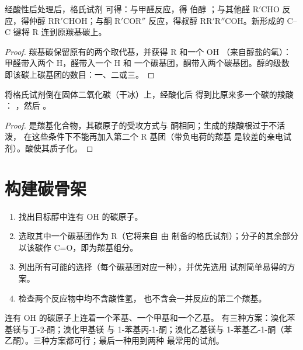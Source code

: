 \begin{proposition}[由羰基化合物制备醇]\label{prop:b1:organomagnesium:carbonyl-addition}
经酸性后处理后，格氏试剂  可得：与甲醛反应，得
伯醇 ；与其他醛 $\mathrm{R'CHO}$ 反应，得仲醇
$\mathrm{RR'CHOH}$；与酮 $\mathrm{R'COR''}$ 反应，得叔醇
$\mathrm{RR'R''COH}$。新形成的 C--C 键将 R 连到原羰基碳上。
\end{proposition}

\begin{proof}
羰基碳保留原有的两个取代基，并获得 R 和一个 OH
（来自醇盐的氧）：甲醛带入两个 H，醛带入一个 H 和
一个碳基团，酮带入两个碳基团。醇的级数
即该碳上碳基团的数目：一、二或三。
\end{proof}

\begin{proposition}[由二氧化碳制备羧酸]\label{prop:b1:organomagnesium:co2}
将格氏试剂倒在固体二氧化碳（干冰）上，经酸化后
得到比原来多一个碳的羧酸 ：
，然后 。
\end{proposition}

\begin{proof}
 是羰基化合物，其碳原子的受攻方式与
酮相同；生成的羧酸根过于不活泼，
在这些条件下不能再加入第二个 R 基团（带负电荷的羰基
是较差的亲电试剂）。酸使其质子化。
\end{proof}

\section{构建碳骨架}

\begin{method}[设计醇的合成路线]\label{met:b1:organomagnesium:plan-alcohol}
\begin{enumerate}
  \item 找出目标醇中连有 OH 的碳原子。
  \item 选取其中一个碳基团作为 R（它将来自
        由  制备的格氏试剂）；分子的其余部分
        以该碳作 C=O，即为羰基组分。
  \item 列出所有可能的选择（每个碳基团对应一种），并优先选用
        试剂简单易得的方案。
  \item 检查两个反应物中均不含酸性氢，
        也不含会一并反应的第二个羰基。
\end{enumerate}
\end{method}

\begin{example}[2-苯基丁-2-醇]\label{ex:b1:organomagnesium:plan}
连有 OH 的碳原子上连着一个苯基、一个甲基和一个乙基。
有三种方案：溴化苯基镁与丁-2-酮；溴化甲基镁
与 1-苯基丙-1-酮；溴化乙基镁与
1-苯基乙-1-酮（苯乙酮）。三种方案都可行；最后一种用到两种
最常用的试剂。
\end{example}

